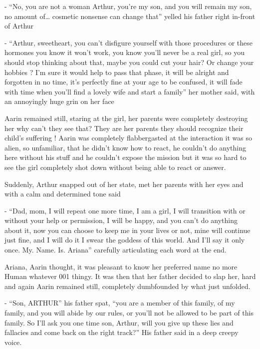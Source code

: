 \documentclass[hidelinks,12pt,a4paper]{book}
\begin{document}
- “No, you are not a woman Arthur, you're my son, and you will remain my son, no amount of… 
cosmetic nonsense can change that” yelled his father right in-front of Arthur\newline

- “Arthur, sweetheart, you can't disfigure yourself with those procedures or 
these hormones you know it won't work, you know you'll never be a real girl, so you should stop
 thinking about that, maybe you could cut your hair? Or change your hobbies ? I'm sure it would help to pass that phase, 
 it will be alright and forgotten in no time, it's perfectly fine at your age to be confused, it will fade with
  time when you'll find a lovely wife and start a family” her mother said, with an annoyingly huge grin on her face\par
  \bigskip

Aarin remained still, staring at the girl, her parents were completely destroying her why can't they see that? 
They are her parents they should recognize their child's suffering ! Aarin was completely flabbergasted at the 
interaction it was so alien, so unfamiliar, that he didn't know how to react, he couldn't do anything here without his 
stuff and he couldn't expose the mission but it was so hard to see the girl completely shot down without being able 
to react or answer.\par
\bigskip

Suddenly, Arthur snapped out of her state, met her parents with her eyes and with a calm and determined tone said\newline

- “Dad, mom, I will repeat one more time, I am a girl, I will transition with or without your help or permission, 
I will be happy, and you can't do anything about it, now you can choose to keep me in your lives or not,
 mine will continue just fine, and I will do it I swear the goddess of this world. And I'll say it only once. 
 My. Name. Is. Ariana” carefully articulating each word at the end.\par
 \bigskip

Ariana, Aarin thought, it was pleasant to know her preferred name no more Human whatever 001 thingy.\newline
It was then that her father decided to slap her, hard and again Aarin remained still, 
completely dumbfounded by what just unfolded.\par
\bigskip

- “Son, ARTHUR” his father spat, “you are a member of this family, of my family, and you will abide by our rules,
or you'll not be allowed to be part of this family. So I'll ask you one time son, Arthur, 
will you give up these lies and fallacies and come back on the right track?” His father said in a deep creepy voice.\newline
\end{document}
